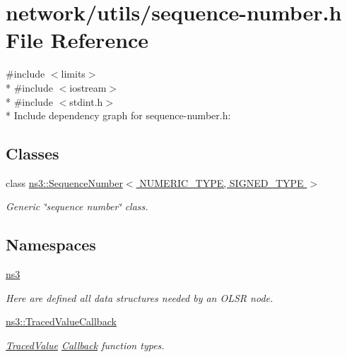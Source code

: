 \hypertarget{sequence-number_8h}{}\section{network/utils/sequence-\/number.h File Reference}
\label{sequence-number_8h}
{\ttfamily \#include $<$limits$>$}\\*
{\ttfamily \#include $<$iostream$>$}\\*
{\ttfamily \#include $<$stdint.\+h$>$}\\*
Include dependency graph for sequence-\/number.h\+:
\subsection*{Classes}
\begin{DoxyCompactItemize}
\item 
class \hyperlink{classns3_1_1SequenceNumber}{ns3\+::\+Sequence\+Number$<$ N\+U\+M\+E\+R\+I\+C\+\_\+\+T\+Y\+P\+E, S\+I\+G\+N\+E\+D\+\_\+\+T\+Y\+P\+E $>$}
\begin{DoxyCompactList}\small\item\em Generic \char`\"{}sequence number\char`\"{} class. \end{DoxyCompactList}\end{DoxyCompactItemize}
\subsection*{Namespaces}
\begin{DoxyCompactItemize}
\item 
 \hyperlink{namespacens3}{ns3}
\begin{DoxyCompactList}\small\item\em Here are defined all data structures needed by an O\+L\+SR node. \end{DoxyCompactList}\item 
 \hyperlink{namespacens3_1_1TracedValueCallback}{ns3\+::\+Traced\+Value\+Callback}
\begin{DoxyCompactList}\small\item\em \hyperlink{classns3_1_1TracedValue}{Traced\+Value} \hyperlink{classns3_1_1Callback}{Callback} function types. \end{DoxyCompactList}\end{DoxyCompactItemize}
